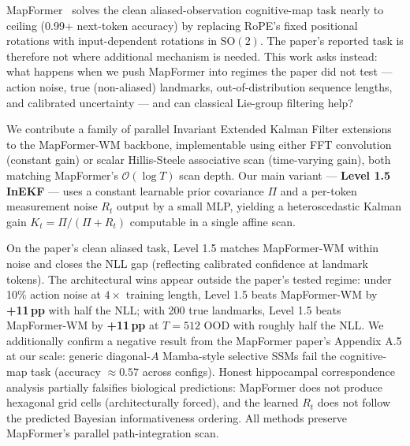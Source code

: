 MapFormer~\citep{rambaud2025mapformer} solves the clean aliased-observation
cognitive-map task nearly to ceiling (0.99+ next-token accuracy) by replacing
RoPE's fixed positional rotations with input-dependent rotations in
$\mathrm{SO}(2)$. The paper's reported task is therefore not where additional
mechanism is needed. This work asks instead: what happens when we push
MapFormer into regimes the paper did not test --- action noise, true
(non-aliased) landmarks, out-of-distribution sequence lengths, and calibrated
uncertainty --- and can classical Lie-group filtering help?
\par
We contribute a family of parallel Invariant Extended Kalman Filter
extensions to the MapFormer-WM backbone, implementable using either FFT
convolution (constant gain) or scalar Hillis-Steele associative scan
(time-varying gain), both matching MapFormer's $\mathcal{O}(\log T)$ scan
depth. Our main variant --- \textbf{Level 1.5 InEKF} --- uses a constant
learnable prior covariance $\Pi$ and a per-token measurement noise $R_t$
output by a small MLP, yielding a heteroscedastic Kalman gain
$K_t = \Pi / (\Pi + R_t)$ computable in a single affine scan.
\par
On the paper's clean aliased task, Level 1.5 matches MapFormer-WM within
noise and closes the NLL gap (reflecting calibrated confidence at landmark
tokens). The architectural wins appear outside the paper's tested regime:
under 10\% action noise at $4\times$ training length, Level 1.5 beats
MapFormer-WM by \textbf{+11\,pp} with half the NLL; with 200 true landmarks,
Level 1.5 beats MapFormer-WM by \textbf{+11\,pp} at $T{=}512$ OOD with roughly
half the NLL. We additionally confirm a negative result from the MapFormer
paper's Appendix A.5 at our scale: generic diagonal-$A$ Mamba-style selective
SSMs fail the cognitive-map task (accuracy $\approx 0.57$ across configs).
Honest hippocampal correspondence analysis partially falsifies biological
predictions: MapFormer does not produce hexagonal grid cells (architecturally
forced), and the learned $R_t$ does not follow the predicted Bayesian
informativeness ordering. All methods preserve MapFormer's parallel
path-integration scan.
